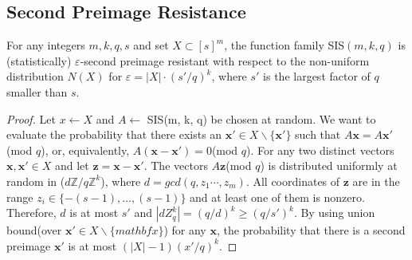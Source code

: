 \documentclass[a4paper]{article}
\theoremstyle{definition}
\theoremstyle{remark}
\renewcommand{\epsilon}{\varepsilon}
\begin{document}
\subsection{Second Preimage Resistance}
\begin{theorem}
  \label{thm:secondpreimage}
  For any integers $m, k, q, s$ and set $X \subset [s]^{m}$, the function family SIS$(m, k, q)$ is 
  (statistically) $\epsilon$-second preimage resistant with respect to the non-uniform distribution $N(X)$
  for $\epsilon = |X|\cdot (s'/q)^{k}$, where $s'$ is the largest factor of $q$ smaller than $s$.
\end{theorem}
\begin{proof}
  Let $x \leftarrow X$ and $A \leftarrow $ SIS(m, k, q) be chosen at random. We want to evaluate the probability 
  that there exists an $\mathbf{x}' \in X  \backslash \{\mathbf{x}'\} $ such that $A\mathbf{x} = A\mathbf{x}'$(mod $q$), or, 
  equivalently, $A(\mathbf{x} - \mathbf{x}') = 0$(mod $q$).
  For any two distinct vectors $\mathbf{x}, \mathbf{x}' \in X$ and let $\mathbf{z} = \mathbf{x} - \mathbf{x}'$.
   The vectors $A\mathbf{z}$(mod $q$) is distributed 
  uniformly at random in ($d\mathbb{Z}/q\mathbb{Z}^{k}$), where $d = gcd(q, z_{1}\cdots,z_{m})$. All coordinates of $\mathbf{z}$
  are in the range $z_{i} \in\{-(s-1), \ldots,(s-1)\}$ and at least one of them is nonzero. Therefore, $d$ is at most $s'$
  and $|dZ_{q}^{k}| = (q/d)^{k} \ge (q/s')^{k}$. By using union bound(over $\mathbf{x}' \in X \backslash \{mathbf{x}\}$)
  for any $\mathbf{x}$, the probability that there is a second preimage $\mathbf{x'}$ is at most $(|X| - 1)(x'/q)^{k}$.
\end{proof}
\end{document}
